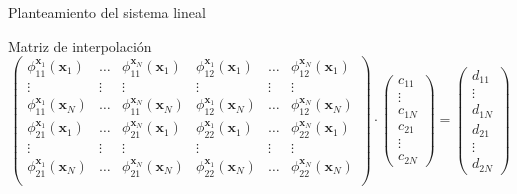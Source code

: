 \documentclass{beamer}
\begin{document}
\begin{frame}{Planteamiento del sistema lineal}

  \begin{block}{Matriz de interpolación}
  $$
  \begin{pmatrix}
  \phi_{11}^{\mathbf{x}_1}(\mathbf{x}_1) & \ldots & \phi_{11}^{\mathbf{x}_N}(\mathbf{x}_1) &
  \phi_{12}^{\mathbf{x}_1}(\mathbf{x}_1) & \ldots & \phi_{12}^{\mathbf{x}_N}(\mathbf{x}_1) \\
  \vdots & \vdots & \vdots & \vdots & \vdots & \vdots \\
  \phi_{11}^{\mathbf{x}_1}(\mathbf{x}_N) & \ldots & \phi_{11}^{\mathbf{x}_N}(\mathbf{x}_N) &
  \phi_{12}^{\mathbf{x}_1}(\mathbf{x}_N) & \ldots & \phi_{12}^{\mathbf{x}_N}(\mathbf{x}_N) \\
  \phi_{21}^{\mathbf{x}_1}(\mathbf{x}_1) & \ldots & \phi_{21}^{\mathbf{x}_N}(\mathbf{x}_1) &
  \phi_{22}^{\mathbf{x}_1}(\mathbf{x}_1) & \ldots & \phi_{22}^{\mathbf{x}_N}(\mathbf{x}_1) \\
  \vdots & \vdots & \vdots & \vdots & \vdots & \vdots \\
  \phi_{21}^{\mathbf{x}_1}(\mathbf{x}_N) & \ldots & \phi_{21}^{\mathbf{x}_N}(\mathbf{x}_N) &
  \phi_{22}^{\mathbf{x}_1}(\mathbf{x}_N) & \ldots & \phi_{22}^{\mathbf{x}_N}(\mathbf{x}_N) \\
  \end{pmatrix} \cdot
  \begin{pmatrix}
    c_{11} \\ \vdots \\ c_{1N} \\ c_{21} \\ \vdots \\ c_{2N}
  \end{pmatrix} =
  \begin{pmatrix}
    d_{11} \\ \vdots \\ d_{1N} \\ d_{21} \\ \vdots \\ d_{2N}   
  \end{pmatrix}
  $$
  \end{block}
\end{frame}
\end{document}
